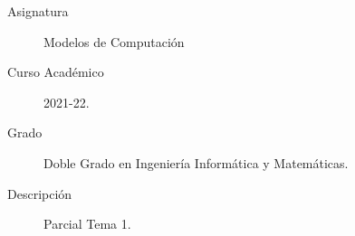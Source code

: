 \documentclass[12pt]{article}
\begin{document}

    
    

    \begin{description}
        \item[Asignatura] Modelos de Computación
        \item[Curso Académico] 2021-22.
        \item[Grado] Doble Grado en Ingeniería Informática y Matemáticas.
        \item[Descripción] Parcial Tema 1.
    \end{description}
    \newpage
    
\end{document}
